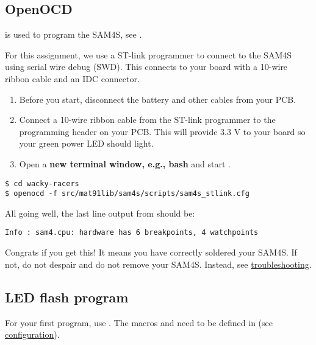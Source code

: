 \subsection{OpenOCD}
\label{openocd}

 is used to program the SAM4S, see .

For this assignment, we use a ST-link programmer to connect to the
SAM4S using serial wire debug (SWD). This connects to your board with
a 10-wire ribbon cable and an IDC connector.

\begin{enumerate}
\item
  Before you start, disconnect the battery and other cables from your
  PCB.
\item
  Connect a 10-wire ribbon cable from the ST-link programmer to the
  programming header on your PCB. This will provide 3.3 V to your
  board so your green power LED should light.
\item
  Open a \textbf{new terminal window, e.g., bash} and
  start .
\end{enumerate}

\begin{verbatim}
$ cd wacky-racers
$ openocd -f src/mat91lib/sam4s/scripts/sam4s_stlink.cfg
\end{verbatim}

All going well, the last line output from  should be:

\begin{verbatim}
Info : sam4.cpu: hardware has 6 breakpoints, 4 watchpoints
\end{verbatim}

Congrats if you get this! It means you have correctly soldered your
SAM4S. If not, do not despair and do not remove your SAM4S. Instead,
see \protect\hyperref[troubleshooting]{troubleshooting}.


\subsection{LED flash program}
\label{led-flash-program}

For your first program, use
. The macros
 and  need to be defined in
 (see
\protect\hyperref[configuration]{configuration}).

\inputminted{C}{../../src/test-apps/ledflash1/ledflash1.c}

